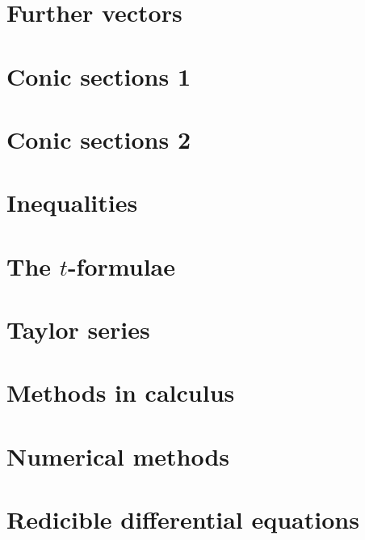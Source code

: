 \chapter{Further vectors}

\chapter{Conic sections 1}

\chapter{Conic sections 2}

\chapter{Inequalities}

\chapter{The $t$-formulae}

\chapter{Taylor series}

\chapter{Methods in calculus}

\chapter{Numerical methods}

\chapter{Redicible differential equations}
